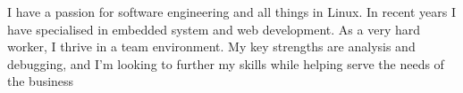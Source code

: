 

\begin{cvparagraph}

I have a passion for software engineering and all things in Linux. In recent years I have specialised in embedded system and web development. As
a very hard worker, I thrive in a team environment. My key strengths are analysis and debugging, and I’m looking to further my skills while helping
serve the needs of the business

\end{cvparagraph}
